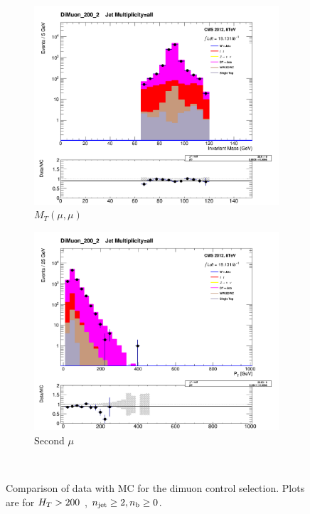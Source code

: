\begin{figure}[!ht]
  \centering
    \begin{subfigure}[b]{0.48\textwidth}
      \includegraphics[width=\textwidth]{Figs/datamc/mumu/Stacked_DiMuon_Mass_all_DiMuon_200_upwards}
      \caption{$M_T(\mu, \mu)$}
    \end{subfigure}
    \begin{subfigure}[b]{0.48\textwidth}
      \includegraphics[width=\textwidth]{Figs/datamc/mumu/Stacked_SecondMuPt_all_DiMuon_200_upwards}
      \caption{Second $\mu$ \Pt}
    \end{subfigure} \\
    \caption{\label{fig:datamc_mumu_inc}
    Comparison of data with MC for the dimuon control selection. Plots 
    are for $H_T>200$ \gev, $n_{\text{jet}}\geq2, n_{\text{b}}\geq0$.}
\end{figure}

